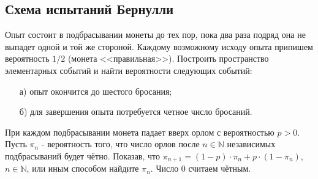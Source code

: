 
\subsection{Схема испытаний Бернулли}

\begin{problem}
Опыт состоит в подбрасывании монеты до тех пор, пока два раза подряд она не выпадет одной и той же стороной. Каждому 
возможному исходу опыта припишем вероятность $1/2$ (монета <<правильная>>). 
Построить пространство элементарных событий и найти вероятности следующих событий: 
\begin{enumerate}
\item[а)] опыт окончится до шестого бросания; 
\item[б)] для завершения опыта потребуется четное число бросаний. 
\end{enumerate}
\end{problem}


\begin{problem}
При каждом подбрасывании монета падает вверх орлом с вероятностью $p>0$. Пусть $\pi _{n} $ - вероятность того, что число орлов после $n\in {\mathbb N}$ независимых подбрасываний будет чётно. Показав, что $\pi _{n+1} =\left(1-p\right)\cdot \pi _{n} +p\cdot \left(1-\pi _{n} \right)$, $n\in {\mathbb N}$, или иным способом найдите $\pi _{n} $. Число $0$ считаем чётным.
\end{problem}

\begin{comment}
\begin{problem}
Симметричную монету независимо бросили $n$ раз. Результат бросания записали в виде последовательности нулей и единиц. Покажите, что с вероятностью стремящейся к единице при $n\to \infty $ длина максимальной подпоследовательности из подряд идущих единиц лежит в промежутке
\[\left(\log \sqrt{n} ,\; \log n^{2} \right).\] 
\end{problem}
\end{comment}
